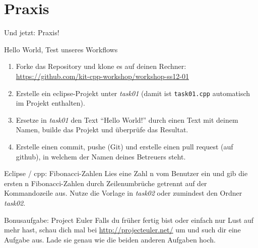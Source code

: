 \section{Praxis}
\begin{frame}[fragile]{Und jetzt: Praxis!}
	\scriptsize
	\begin{block}{Hello World, Test unseres Workflows}
		\begin{enumerate}
			\item	Forke das Repository und klone es auf deinen Rechner:
		\url{https://github.com/kit-cpp-workshop/workshop-ss12-01}
			\item Erstelle ein eclipse-Projekt unter \emph{task01} {\tiny(damit ist \verb|task01.cpp| automatisch im Projekt enthalten)}.
			\item Ersetze in \emph{task01} den Text \enquote{Hello World!} durch einen Text mit deinem Namen, builde das Projekt und überprüfe das Resultat.
			\item Erstelle einen commit, pushe (Git) und erstelle einen pull request (auf github), in welchem der Namen deines Betreuers steht.
		\end{enumerate}
	\end{block}
	
	\begin{block}{Eclipse / cpp: Fibonacci-Zahlen}
		Lies eine Zahl n vom Benutzer ein und gib die ersten n Fibonacci-Zahlen durch Zeilenumbrüche getrennt auf der Kommandozeile aus. Nutze die Vorlage in \emph{task02} oder zumindest den Ordner \emph{task02}.
	\end{block}
	
	\begin{block}{Bonusaufgabe: Project Euler}
		Falls du früher fertig bist oder einfach nur Lust auf mehr hast, schau dich mal bei \url{http://projecteuler.net/} um und such dir eine Aufgabe aus. Lade sie genau wie die beiden anderen Aufgaben hoch.
	\end{block}
\end{frame}
